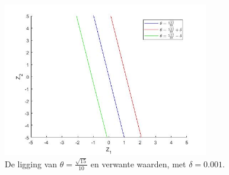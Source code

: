 \documentclass[12pt]{article}
\begin{document}
\begin{figure}[H]
    \centering
    \includegraphics[width=0.8\textwidth]{cons_theta_RKs3.jpg}
    \caption{De ligging van \(\theta=\frac{\sqrt{15}}{10}\) en verwante waarden, met \(\delta=0.001\).}
    \label{fig:consthetarks3}
\end{figure}
\end{document}
